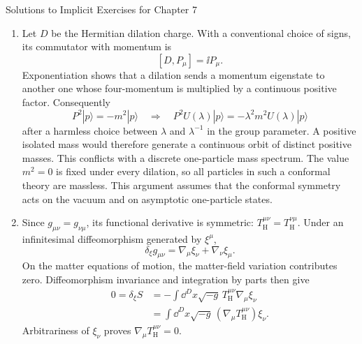 \begin{bankssolutions}{Solutions to Implicit Exercises for Chapter 7}
\begin{enumerate}[label=(\alph*)]
For a symmetric conserved stress tensor, the current associated with a
conformal Killing vector is $j_f^\mu=T^{\mu\nu}f_\nu$.  The conformal Killing
equation gives
\[
 \partial_\mu j_f^\mu
 =T^{\mu\nu}\partial_\mu f_\nu
 =\frac14(\partial\cdot f)T^\mu{}_{\mu}.
\]
The dilation has $\partial\cdot f=4\lambda$, while a special conformal
transformation has a position-dependent divergence.  Their currents are
conserved when the improved stress tensor is traceless.  Equivalently, a
local Weyl variation $\delta g_{\mu\nu}=2\sigma(x)g_{\mu\nu}$ couples to
$T^\mu{}_{\mu}$; invariance for arbitrary $\sigma(x)$ sets this trace to
zero.  A removable virial divergence is absorbed into the same improvement.

\item Let $D$ be the Hermitian dilation charge.  With a conventional choice
of signs, its commutator with momentum is
\[
 [D,P_\mu]=\ii P_\mu.
\]
Exponentiation shows that a dilation sends a momentum eigenstate to another
one whose four-momentum is multiplied by a continuous positive factor.
Consequently
\[
 P^2|p\rangle=-m^2|p\rangle
 \quad\Longrightarrow\quad
 P^2U(\lambda)|p\rangle=-\lambda^2m^2U(\lambda)|p\rangle
\]
after a harmless choice between $\lambda$ and $\lambda^{-1}$ in the group
parameter.  A positive isolated mass would therefore generate a continuous
orbit of distinct positive masses.  This conflicts with a discrete
one-particle mass spectrum.  The value $m^2=0$ is fixed under every dilation,
so all particles in such a conformal theory are massless.  This argument
assumes that the conformal symmetry acts on the vacuum and on asymptotic
one-particle states.

\item Since $g_{\mu\nu}=g_{\nu\mu}$, its functional derivative is symmetric:
$T_{\mathrm H}^{\mu\nu}=T_{\mathrm H}^{\nu\mu}$.  Under an infinitesimal
diffeomorphism generated by $\xi^\mu$,
\[
 \delta_\xi g_{\mu\nu}=\nabla_\mu\xi_\nu+\nabla_\nu\xi_\mu.
\]
On the matter equations of motion, the matter-field variation contributes
zero.  Diffeomorphism invariance and integration by parts then give
\begin{align*}
 0=\delta_\xi S
 &=-\int\dd^D x\sqrt{-g}\,
 T_{\mathrm H}^{\mu\nu}\nabla_\mu\xi_\nu\\
 &=\int\dd^D x\sqrt{-g}\,
 (\nabla_\mu T_{\mathrm H}^{\mu\nu})\xi_\nu.
\end{align*}
Arbitrariness of $\xi_\nu$ proves
$\nabla_\mu T_{\mathrm H}^{\mu\nu}=0$.


\end{enumerate}
\end{bankssolutions}
